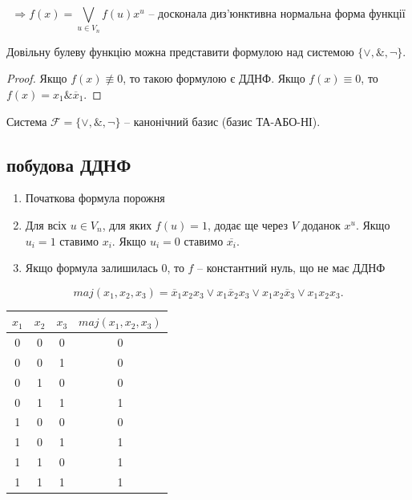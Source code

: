 \begin{definition}
    \begin{equation*}
        \Rightarrow f(x) = \bigvee_{u \in V_n} f(u) x^u \text{ -- досконала диз'юнктивна нормальна форма функції}
    \end{equation*}
\end{definition}

\begin{corollary}
    Довільну булеву функцію можна представити формулою над системою $\{\vee, \&, \neg\}$.
\end{corollary}
\begin{proof}
    Якщо $f(x) \not\equiv 0$, то такою формулою є ДДНФ.
    Якщо $f(x) \equiv 0$, то $f(x) = x_1 \& \overline{x}_1$.
\end{proof}

\begin{definition}
    Система $\mathcal{F} = \{\vee, \&, \neg\}$ -- канонічний базис (базис ТА-АБО-НІ).
\end{definition}

\subsection{побудова ДДНФ}

\begin{enumerate}
    \item Початкова формула порожня
    \item Для всіх $u \in V_n$, для яких $f(u) = 1$, додає ще через $V$ доданок $x^u$.
    Якщо $u_i = 1$ ставимо $x_i$.
    Якщо $u_i = 0$ ставимо $\overline{x_i}$.
    \item Якщо формула залишилась 0, то $f$ -- константний нуль,
    що не має ДДНФ
\end{enumerate}

\begin{example}
    \begin{equation*}
        maj(x_1, x_2, x_3) = \overline{x}_1 x_2 x_3 \vee x_1 \overline{x}_2 x_3 \vee x_1 x_2 \overline{x}_3 \vee x_1 x_2 x_3.
    \end{equation*}
    \begin{center}
        \begin{tabular}{ccc||c}
            $x_1$ & $x_2$ & $x_3$ & $maj(x_1, x_2, x_3)$ \\
            \hline\hline
            0&0&0&0 \\
            0&0&1&0 \\
            0&1&0&0 \\
            0&1&1&1 \\
            1&0&0&0 \\
            1&0&1&1 \\
            1&1&0&1 \\
            1&1&1&1 \\
        \end{tabular}
    \end{center}
\end{example}

